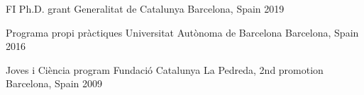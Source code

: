 



\begin{cvhonors}

  \cvhonor
    {FI Ph.D. grant} %
    {Generalitat de Catalunya} %
    {Barcelona, Spain} %
    {2019} %

  \cvhonor
    {Programa propi pràctiques} %
    {Universitat Autònoma de Barcelona} %
    {Barcelona, Spain} %
    {2016} %

  \cvhonor
    {Joves i Ciència program} %
    {Fundació Catalunya La Pedreda, 2nd promotion} %
    {Barcelona, Spain} %
    {2009} %

\end{cvhonors}
